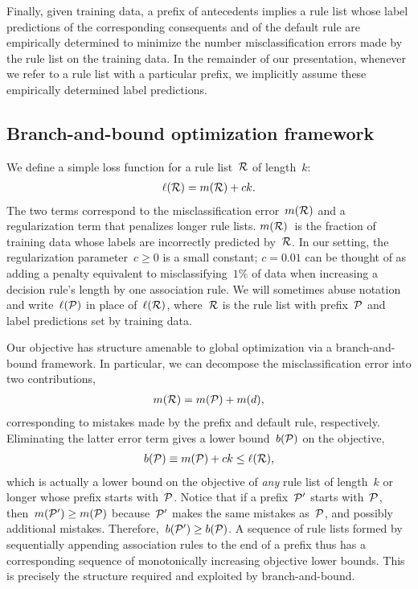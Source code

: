 Finally, given training data, a prefix of antecedents implies a rule list
whose label predictions of the corresponding consequents and of the default rule
are empirically determined to minimize the number misclassification errors made
by the rule list on the training data.
%
In the remainder of our presentation, whenever we refer to a rule list with a
particular prefix, we implicitly assume these empirically determined label predictions.

\subsection{Branch-and-bound optimization framework}

We define a simple loss function for a rule list~${\mathcal R}$ of length~$k$:
\begin{align}
\ell(\RL) = m(\RL) + c k.
\label{eq:objective}
\end{align}
The two terms correspond to the misclassification error~$m({\mathcal R})$
and a regularization term that penalizes longer rule lists.
%
$m({\mathcal R})$~is the fraction of training data whose labels are
incorrectly predicted by~${\mathcal R}$.
%
In our setting, the regularization parameter~${c \ge 0}$ is a small constant;
\eg ${c = 0.01}$ can be thought of as adding a penalty equivalent to misclassifying~$1\%$
of data when increasing a decision rule's length by one association rule.
%
We will sometimes abuse notation and write~$\ell({\mathcal P})$ in place of~$\ell({\mathcal R})$,
where~${\mathcal R}$ is the rule list with prefix~${\mathcal P}$ and label predictions set by training data.

Our objective has structure amenable to global optimization via a branch-and-bound framework.
%
In particular, we can decompose the misclassification error into two contributions, 
\begin{align}
m(\RL) = m(\Prefix) + m(d),
\end{align}
corresponding to mistakes made by the prefix and default rule, respectively.
%
Eliminating the latter error term gives a lower bound~$b({\mathcal P})$ on the objective,
\begin{align}
b(\Prefix) \equiv m(\Prefix) + c k \le \ell(\RL),
\label{eq:lower-bound}
\end{align}
which is actually a lower bound on the objective of \emph{any} rule list
of length~$k$ or longer whose prefix starts with~${\mathcal P}$.
%
Notice that if a prefix~${\mathcal P}'$ starts with~${\mathcal P}$, then~${m({\mathcal P}') \ge m({\mathcal P})}$
because~${\mathcal P}'$ makes the same mistakes as~${\mathcal P}$, and possibly additional mistakes.
%
Therefore,~${b({\mathcal P}') \ge b({\mathcal P})}$.
%
A sequence of rule lists formed by sequentially appending association rules
to the end of a prefix thus has a corresponding sequence of
monotonically increasing objective lower bounds.
%
This is precisely the structure required and exploited by branch-and-bound.

